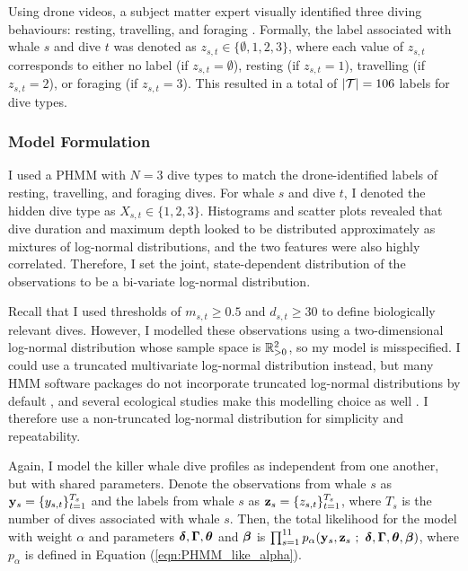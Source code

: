 Using drone videos, a subject matter expert visually identified three diving behaviours: resting, travelling, and foraging \citep[classification criteria are given in Table 2 of][]{McRae:2024}. Formally, the label associated with whale $s$ and dive $t$ was denoted as $z_{s,t} \in \{\emptyset,1,2,3\}$, where each value of $z_{s,t}$ corresponds to either no label (if $z_{s,t} = \emptyset$), resting (if $z_{s,t} = 1$), travelling (if $z_{s,t} = 2$), or foraging (if $z_{s,t} = 3$). This resulted in a total of $|\mathcal{T}| = 106$ labels for dive types. 

\subsubsection{Model Formulation}

I used a PHMM with $N = 3$ dive types to match the drone-identified labels of resting, travelling, and foraging dives. For whale $s$ and dive $t$, I denoted the hidden dive type as $X_{s,t} \in \{1,2,3\}$. 
%
Histograms and scatter plots revealed that dive duration and maximum depth looked to be distributed approximately as mixtures of log-normal distributions, and the two features were also highly correlated. Therefore, I set the joint, state-dependent distribution of the observations to be a bi-variate log-normal distribution. 

Recall that I used thresholds of $m_{s,t} \geq 0.5$ and $d_{s,t} \geq 30$ to define biologically relevant dives. However, I modelled these observations using a two-dimensional log-normal distribution whose sample space is $\mathbb{R}_{>0}^2$, so my model is misspecified. I could use a truncated multivariate log-normal distribution instead, but many HMM software packages do not incorporate truncated log-normal distributions by default \citep{McClintock:2018,Visser:2010}, and several ecological studies make this modelling choice as well \citep{Barajas:2017, Quick:2017, Tennessen:2019b}. I therefore use a non-truncated log-normal distribution for simplicity and repeatability. %

Again, I model the killer whale dive profiles as independent from one another, but with shared parameters. Denote the observations from whale $s$ as $\mathbf{y}_s = \{y_{s,t}\}_{t=1}^{T_s}$ and the labels from whale $s$ as $\mathbf{z}_s = \{z_{s,t}\}_{t=1}^{T_s}$, where $T_s$ is the number of dives associated with whale $s$. Then, the total likelihood for the model with weight $\alpha$ and parameters $\boldsymbol{\delta}, \boldsymbol{\Gamma}, \boldsymbol{\theta}$ and $\boldsymbol{\beta}$ is $\prod_{s=1}^{11} p_\alpha (\mathbf{y}_s,\mathbf{z}_s ~;~ \boldsymbol{\delta}, \boldsymbol{\Gamma}, \boldsymbol{\theta}, \boldsymbol{\beta})$, where $p_\alpha$ is defined in Equation (\ref{eqn:PHMM_like_alpha}).

